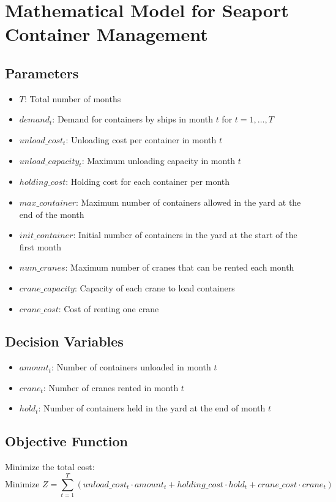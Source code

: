 \documentclass{article}
\begin{document}
\section*{Mathematical Model for Seaport Container Management}

\subsection*{Parameters}
\begin{itemize}
    \item $T$: Total number of months
    \item $demand_{t}$: Demand for containers by ships in month $t$ for $t = 1, \ldots, T$
    \item $unload\_cost_{t}$: Unloading cost per container in month $t$
    \item $unload\_capacity_{t}$: Maximum unloading capacity in month $t$
    \item $holding\_cost$: Holding cost for each container per month
    \item $max\_container$: Maximum number of containers allowed in the yard at the end of the month
    \item $init\_container$: Initial number of containers in the yard at the start of the first month
    \item $num\_cranes$: Maximum number of cranes that can be rented each month
    \item $crane\_capacity$: Capacity of each crane to load containers
    \item $crane\_cost$: Cost of renting one crane
\end{itemize}

\subsection*{Decision Variables}
\begin{itemize}
    \item $amount_{t}$: Number of containers unloaded in month $t$
    \item $crane_{t}$: Number of cranes rented in month $t$
    \item $hold_{t}$: Number of containers held in the yard at the end of month $t$
\end{itemize}

\subsection*{Objective Function}
Minimize the total cost:
\[
\text{Minimize } Z = \sum_{t=1}^{T} \left( unload\_cost_{t} \cdot amount_{t} + holding\_cost \cdot hold_{t} + crane\_cost \cdot crane_{t} \right)
\]
\end{document}
